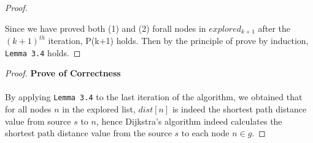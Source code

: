 \documentclass[11pt, oneside]{article}   	%
\newcommand\tab[1][1cm]{\hspace*{#1}}
\newcommand\ftab[1][5cm]{\hspace*{#1}}
\theoremstyle{definition}
\begin{document}
\begin{proof}
\begin{itemize}
\begin{enumerate}
  \end{enumerate}
\end{itemize}
Since we have proved both (1) and (2) forall nodes in $explored_{k+1}$ after the $(k+1)^{th}$ iteration, P(k+1) holds. Then by the principle of prove by induction, \texttt{Lemma 3.4} holds. 
\end{proof}

\begin{proof}\textbf{Prove of Correctness}
\\\\
By applying \texttt{Lemma 3.4} to the last iteration of the algorithm, we obtained that for all nodes $n$ in the explored list, $dist[n]$ is indeed the shortest path distance value from source $s$ to $n$, hence Dijkstra's algorithm indeed calculates the shortest path distance value from the source $s$ to each node $n \in g$. 
\end{proof}
\end{document}
